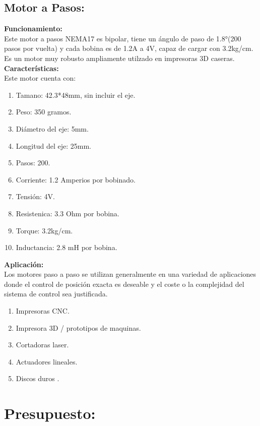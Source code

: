 \documentclass[14pt,a4paper]{article}
\begin{document}
\subsection{Motor a Pasos:}
\textbf{Funcionamiento:}\\
Este motor a pasos NEMA17 es bipolar, tiene un ángulo de paso de 1.8°(200 pasos por vuelta) y cada bobina es de 1.2A a 4V, capaz de cargar con 3.2kg/cm. Es un motor muy robusto ampliamente utilzado en impresoras 3D caseras.
\textbf{Características:}\\
Este motor cuenta con:\\
\begin{enumerate}
\item Tamano: 42.3*48mm, sin incluir el eje.
\item Peso: 350 gramos.
\item Diámetro del eje: 5mm.
\item Longitud del eje: 25mm.
\item Pasos: 200.
\item Corriente: 1.2 Amperios por bobinado.
\item Tensión: 4V.
\item Resistenica: 3.3 Ohm por bobina.
\item Torque: 3.2kg/cm.
\item Inductancia: 2.8 mH por bobina.
\end{enumerate}
\textbf{Aplicación:}\\
Los motores paso a paso se utilizan generalmente en una variedad de aplicaciones donde el control de posición exacta es deseable y el coste o la complejidad del sistema de control sea justificada.\\
\begin{enumerate}
\item Impresoras CNC.
\item Impresora 3D / prototipos de maquinas.
\item Cortadoras laser.
\item Actuadores lineales.
\item Discos duros .
\end{enumerate}

\section{Presupuesto:}
\end{document}
